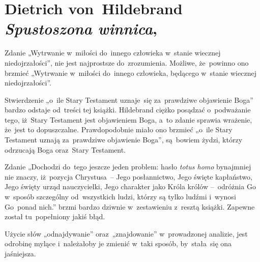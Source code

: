 \documentclass[a4paper,11pt]{article}
\numberwithin{equation}{section}
\begin{document}










\newpage

\section{Dietrich von~Hildebrand \textit{Spustoszona
    winnica}, \cite{HildebrandSpustoszonaWinnica2006}}





\noindent
{} Zdanie „Wytrwanie w~miłości do~innego człowieka
w~stanie
wiecznej niedojrzałości”, nie jest najprostsze do~zrozumienia. Możliwe,
że~powinno ono brzmieć „Wytrwanie w~miłości do~innego człowieka, będącego
w~stanie wiecznej niedojrzałości”.

\VerSpaceFour





\noindent
{} Stwierdzenie „o~ile Stary Testament uznaje~się za~prawdziwe
objawienie Boga” bardzo odstaje od~treści tej książki. Hildebrand ciężko
posądzać o~podważanie tego, iż~Stary Testament jest objawieniem Boga, a~to
zdanie sprawia wrażenie, że~jest to dopuszczalne. Prawdopodobnie miało ono
brzmieć „o~ile Stary Testament uznają za~prawdziwe objawienie Boga”,
są~bowiem żydzi, którzy odrzucają Boga oraz~Stary Testament.

\VerSpaceFour





\noindent
{} Zdanie „Dochodzi do~tego jeszcze jeden problem: hasło
\textit{totus homo} bynajmniej nie znaczy, iż~pozycja Chrystusa~--
Jego posłannictwo, Jego święte kapłaństwo, Jego święty urząd
nauczycielki, Jego charakter jako Króla królów --~odróżnia Go w~sposób
szczególny od~wszystkich ludzi, którzy są tylko ludźmi i~wynosi
Go~ponad nich.” brzmi bardzo dziwnie w~zestawieniu z~resztą książki.
Zapewne został tu~popełniony jakiś błąd.

\VerSpaceFour





\noindent
{} Użycie słów „odnajdywanie” oraz~„znajdowanie” w~prowadzonej
analizie, jest odrobinę mylące i~należałoby je zmienić w~taki sposób,
by~stała~się ona jaśniejsza.
\end{document}
